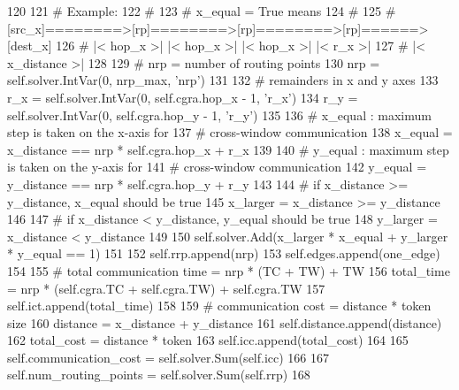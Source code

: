 \begin{DoxyCode}
120 
121         \textcolor{comment}{# Example:}
122         \textcolor{comment}{#}
123         \textcolor{comment}{# x\_equal = True means}
124         \textcolor{comment}{#}
125         \textcolor{comment}{# [src\_x]========>[rp]========>[rp]========>[rp]======>[dest\_x]}
126         \textcolor{comment}{#     |< hop\_x >|  |< hop\_x >|  |< hop\_x >|  |< r\_x >|}
127         \textcolor{comment}{#     |< x\_distance                 >|}
128 
129         \textcolor{comment}{# nrp = number of routing points}
130         nrp = self.solver.IntVar(0, nrp\_max, \textcolor{stringliteral}{'nrp'})
131 
132         \textcolor{comment}{# remainders in x and y axes}
133         r\_x = self.solver.IntVar(0, self.cgra.hop\_x - 1, \textcolor{stringliteral}{'r\_x'})
134         r\_y = self.solver.IntVar(0, self.cgra.hop\_y - 1, \textcolor{stringliteral}{'r\_y'})
135 
136         \textcolor{comment}{# x\_equal : maximum step is taken on the x-axis for}
137         \textcolor{comment}{# cross-window communication}
138         x\_equal = x\_distance == nrp * self.cgra.hop\_x + r\_x
139 
140         \textcolor{comment}{# y\_equal : maximum step is taken on the y-axis for}
141         \textcolor{comment}{# cross-window communication}
142         y\_equal = y\_distance == nrp * self.cgra.hop\_y + r\_y
143 
144         \textcolor{comment}{# if x\_distance >= y\_distance, x\_equal should be true}
145         x\_larger = x\_distance >= y\_distance
146 
147         \textcolor{comment}{# if x\_distance < y\_distance, y\_equal should be true}
148         y\_larger = x\_distance < y\_distance
149 
150         self.solver.Add(x\_larger * x\_equal + y\_larger * y\_equal == 1)
151 
152         self.rrp.append(nrp)
153         self.edges.append(one\_edge)
154 
155         \textcolor{comment}{# total communication time = nrp * (TC + TW) + TW}
156         total\_time = nrp * (self.cgra.TC + self.cgra.TW) + self.cgra.TW
157         self.ict.append(total\_time)
158 
159         \textcolor{comment}{# communication cost = distance * token size}
160         distance = x\_distance + y\_distance
161         self.distance.append(distance)
162         total\_cost = distance * token
163         self.icc.append(total\_cost)
164 
165     self.communication\_cost = self.solver.Sum(self.icc)
166 
167     self.num\_routing\_points = self.solver.Sum(self.rrp)
168 
\end{DoxyCode}
\mbox{\label{classsylva_1_1code__generation_1_1floorplanner_1_1floorplanner_a4ef5c93298c0f40db47c15ed7c9c6f02}} 
